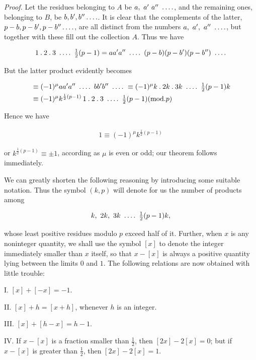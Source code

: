 \emph{Proof.} Let the residues belonging to $A$ be $a,\ a'\ a''\ \mathinner{.\,.\,.\,.}$, and the remaining ones, belonging to $B$, be $b,b',b''\mathinner{.\,.\,.\,.}$. It is clear that the complements of the latter, $p-b,p-b',p-b''\mathinner{.\,.\,.\,.}$, are all distinct from the numbers $a,\ a',\ a''\ \dotsfour$, but together with these fill out the collection $A$. Thus we have

\[
\begin{aligned}
1\pdot2\pdot3\ \dotsfour\ \tfrac12(p-1)=aa' a''\ \dotsfour\ (p-b)(p-b')(p-b'')\ \dotsfour
\end{aligned}
\]

But the latter product evidently becomes

\[
\begin{aligned}
&\equiv(-1)^\mu aa' a''\ \dotsfour\ bb' b''\ \dotsfour\ \equiv(-1)^\mu k\pdot2k\pdot3k\ \dotsfour\ \tfrac12(p-1)k\\
&\equiv(-1)^\mu k^{\frac12(p-1)}\,1\pdot2\pdot3\ \dotsfour\ \tfrac12(p-1) (\mathrm{mod.}p)
\end{aligned}
\]

Hence we have

\[
\begin{aligned}
1\equiv(-1)^\mu k^{\frac12(p-1)}
\end{aligned}
\]

or $k^{\frac12(p-1)}\equiv\pm1$, according as $\mu$ is even or odd; our theorem follows immediately.


We can greatly shorten the following reasoning by introducing some suitable notation. Thus the symbol $(k,p)$ will denote for us the number of products among

\[
\begin{aligned}
k,\ 2k,\ 3k\ \mathinner{.\,.\,.\,.}\ \tfrac12(p-1)k,
\end{aligned}
\]

whose least positive residues modulo $p$ exceed half of it. Further, when $x$ is any noninteger quantity, we shall use the symbol $[x]$ to denote the integer immediately smaller than $x$ itself, so that $x-[x]$ is always a positive quantity lying between the limits $0$ and $1$. The following relations are now obtained with little trouble:

I. $[x]+[-x]=-1.$

II. $[x]+h=[x+h]$, whenever $h$ is an integer.

III. $[x]+[h-x]=h-1.$

IV. If $x-[x]$ is a fraction smaller than $\tfrac12$, then $[2x]-2[x]=0$; but if $x-[x]$ is greater than $\tfrac12$, then $[2x]-2[x]=1.$

